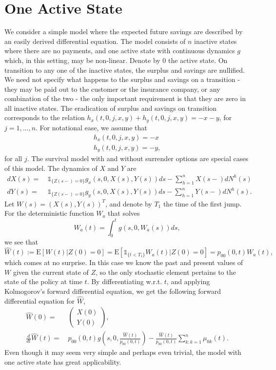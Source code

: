 \documentclass[12pt]{article}
\newcommand{\E}{\text{E}}
\newcommand{\indic}[1]{\mathds{1}_{ \{ #1 \} }}
\theoremstyle{my_thm}
\theoremstyle{my_rem}
\begin{document}
\section{One Active State}
We consider a simple model where the expected future savings are described by an easily derived differential equation. The model consists of $n$ inactive states where there are no payments, and one active state with continuous dynamics $g$ which, in this setting, may be non-linear. Denote by $0$ the active state. On transition to any one of the inactive states, the surplus and savings are nullified. We need not specify what happens to the surplus and savings on a transition - they may be paid out to the customer or the insurance company, or any combination of the two - the only important requirement is that they are zero in all inactive states. The eradication of surplus and savings on transition corresponds to the relation $h_x(t,0,j,x,y)+h_y(t,0,j,x,y)=-x-y$, for $j=1,...,n$. For notational ease, we assume that 
\begin{gather*}
h_x(t,0,j,x,y)=-x
\\
h_y(t,0,j,x,y)=-y,
\end{gather*}
for all $j$. The survival model with and without surrender options are special cases of this model.  The dynamics of $X$ and $Y$ are
\begin{align*}
dX(s)= \ & \indic{Z(s-)=0} g_x(s,0,X(s),Y(s))ds - \sum_{h=1}^n X(s-)dN^h(s)
\\
dY(s)= \ & \indic{Z(s-)=0} g_y(s,0,X(s),Y(s))ds - \sum_{h=1}^n Y(s-)dN^h(s).
\end{align*}
Let $W(s)=(X(s),Y(s))^T$, and denote by $T_1$ the time of the first jump. For the deterministic function $W_a$ that solves
$$
W_a(t)=\int_0^t g(s,0,W_a(s)) ds,
$$
we see that
$$
\hat{W}(t):=\E[W(t)|Z(0)=0] = \E [  \indic{t<T_1} W_a(t)|Z(0)=0]  = p_{00}(0,t) W_a(t),
$$
which comes at no surprise. In this case we know the past and present values of $W$ given the current state of $Z$, so the only stochastic element pertains to the state of the policy at time $t$. By differentiating w.r.t. $t$, and applying Kolmogorov's forward differential equation, we get the following forward differential equation for $\hat{W}$,
\begin{align*}
\hat{W}(0)= \ &\begin{pmatrix}
X(0)\\
Y(0)
\end{pmatrix},
\\
\frac{d}{dt}\hat{W}(t)= \ &p_{00}(0,t) g \left( s,0,\frac{\hat{W}(t)}{p_{00}(0,t)}\right)
-
\frac{\hat{W}(t)}{p_{00}(0,t)}\sum_{k:k=1}^n \mu_{0k}(t).
\end{align*}
Even though it may seem very simple and perhaps even trivial, the model with one active state has great applicability.
\end{document}
